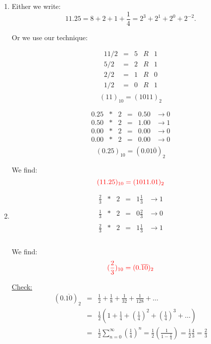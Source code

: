 \documentclass[pdftex,11pt]{article}
\begin{document}
\begin{enumerate}
\item
Either we write:
$$ 11.25 = 8 + 2 + 1 + \frac{1}{4} = 2^3 + 2^1 + 2^0 + 2^{-2}.$$

Or we use our technique:\\
\begin{minipage}{.4\textwidth}
$$
\begin{array}{rcrcc}
11/2  & = &    5 & R & 1 \\
5/2   & = &    2 & R & 1 \\
2/2  & = &     1 & R & 0 \\
1/2  & = &     0 & R & 1 \\
\end{array}
$$
$$ (11)_{10} = (1011)_2$$
\end{minipage}
\begin{minipage}{.4\textwidth}
$$
\begin{array}{rcrccc}
0.25& *& 2   & = & 0.50 &    \rightarrow     0  \\
0.50& *& 2   & = & 1.00 &    \rightarrow     1  \\
0.00& *& 2   & = & 0.00 &    \rightarrow     0  \\
\hline
0.00 & *& 2   & = & 0.00 &    \rightarrow     0  \\
\end{array}
$$
$$ (0.25)_{10} = (0.01\overline{0})_2$$
\end{minipage}

We find:
$$\color{red} (11.25)_{10} = (1011.01)_2 $$

\item 

$$
\begin{array}{rcrccc}
\frac{2}{3}& *& 2   & = & 1\frac{1}{3}&    \rightarrow     1  \\\\
\frac{1}{3}& *& 2   & = & 0\frac{2}{3}&    \rightarrow     0  \\\\
\hline
\frac{2}{3}& *& 2   & = & 1\frac{1}{3}&    \rightarrow     1  \\\\
\end{array}
$$

We find:
$$\color{red} (\frac{2}{3})_{10} = (0.\overline{10})_2 $$

\underline{Check:}
\begin{eqnarray}
(0.\overline{10})_{2} 
\nonumber & = & \frac{1}{2}+ \frac{1}{8}+ \frac{1}{32}+ \frac{1}{128}+\ldots\\
\nonumber & = & \frac{1}{2}\left(1 + \frac{1}{4}+ \left(\frac{1}{4}\right)^2+ \left(\frac{1}{4}\right)^3+\ldots \right)\\
\nonumber & = & \frac{1}{2}\sum_{n=0}^\infty\left(\frac{1}{4}\right)^n
 = \frac{1}{2}\left(\frac{1}{1-\frac{1}{4}}\right)
 = \frac{1}{2}\frac{4}{3}
 = \frac{2}{3}
\end{eqnarray}


\end{enumerate}
\end{document}
